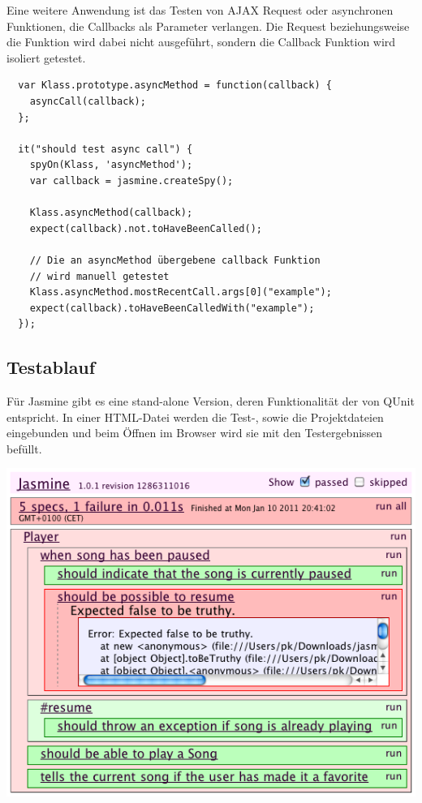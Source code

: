 \documentclass[11pt, a4paper]{article}
\begin{document}
Eine weitere Anwendung ist das Testen von AJAX Request oder asynchronen
Funktionen, die Callbacks als Parameter verlangen. Die Request beziehungsweise
die Funktion wird dabei nicht ausgeführt, sondern die Callback Funktion wird
isoliert getestet.

\begin{verbatim}
  var Klass.prototype.asyncMethod = function(callback) {
    asyncCall(callback);
  };

  it("should test async call") {
    spyOn(Klass, 'asyncMethod');
    var callback = jasmine.createSpy();

    Klass.asyncMethod(callback);
    expect(callback).not.toHaveBeenCalled();

    // Die an asyncMethod übergebene callback Funktion
    // wird manuell getestet
    Klass.asyncMethod.mostRecentCall.args[0]("example");
    expect(callback).toHaveBeenCalledWith("example");
  });
\end{verbatim}

\clearpage

\subsection{Testablauf}

Für Jasmine gibt es eine stand-alone Version, deren Funktionalität der von QUnit
entspricht. In einer HTML-Datei werden die Test-, sowie die Projektdateien
eingebunden und beim Öffnen im Browser wird sie mit den Testergebnissen befüllt.

\begin{center}
  \includegraphics[width = 1\textwidth]{Jasmine.png}
\end{center}
\end{document}

